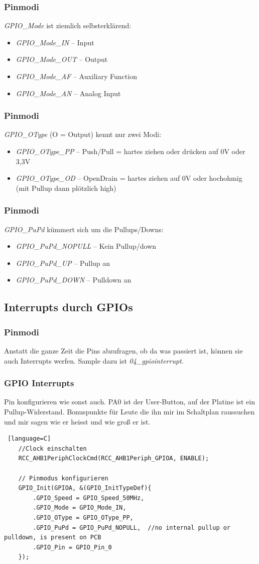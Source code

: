 \documentclass[ngerman,compress]{beamer}
\begin{document}
\begin{frame}
	\frametitle{Pinmodi}
	\emph{GPIO\_Mode} ist ziemlich selbsterklärend:
	\begin{itemize}
		\item \emph{GPIO\_Mode\_IN} -- Input
		\item \emph{GPIO\_Mode\_OUT} -- Output
		\item \emph{GPIO\_Mode\_AF} -- Auxiliary Function
		\item \emph{GPIO\_Mode\_AN} -- Analog Input
	\end{itemize}
\end{frame}

\begin{frame}
	\frametitle{Pinmodi}
	\emph{GPIO\_OType} (O = Output) kennt nur zwei Modi:
	\begin{itemize}
		\item \emph{GPIO\_OType\_PP} -- Push/Pull = hartes ziehen oder drücken auf 0V oder 3,3V
		\item \emph{GPIO\_OType\_OD} -- OpenDrain = hartes ziehen auf 0V oder hochohmig (mit Pullup dann plötzlich high)
	\end{itemize}
\end{frame}

\begin{frame}
	\frametitle{Pinmodi}
	\emph{GPIO\_PuPd} kümmert sich um die Pullups/Downs:
	\begin{itemize}
		\item \emph{GPIO\_PuPd\_NOPULL} -- Kein Pullup/down
		\item \emph{GPIO\_PuPd\_UP} -- Pullup an
		\item \emph{GPIO\_PuPd\_DOWN} -- Pulldown an
	\end{itemize}
\end{frame}


\subsection{Interrupts durch GPIOs}

\begin{frame} [fragile]
	\frametitle{Pinmodi}
	Anstatt die ganze Zeit die Pins abzufragen, ob da was passiert ist, können sie auch Interrupts werfen. Sample dazu ist \emph{04\_gpiointerrupt}.
\end{frame}

\begin{frame} [fragile]
	\frametitle{GPIO Interrupts}
	Pin konfigurieren wie sonst auch. PA0 ist der User-Button, auf der Platine ist ein Pullup-Widerstand. Bonuspunkte für Leute die ihn mir im Schaltplan raussuchen und mir sagen wie er heisst und wie groß er ist.
	\begin{lstlisting} [language=C]
	//Clock einschalten
	RCC_AHB1PeriphClockCmd(RCC_AHB1Periph_GPIOA, ENABLE);

	// Pinmodus konfigurieren
	GPIO_Init(GPIOA, &(GPIO_InitTypeDef){
		.GPIO_Speed = GPIO_Speed_50MHz,
		.GPIO_Mode = GPIO_Mode_IN,
		.GPIO_OType = GPIO_OType_PP,
		.GPIO_PuPd = GPIO_PuPd_NOPULL,	//no internal pullup or pulldown, is present on PCB
		.GPIO_Pin = GPIO_Pin_0
	});
	\end{lstlisting}
\end{frame}
\end{document}
